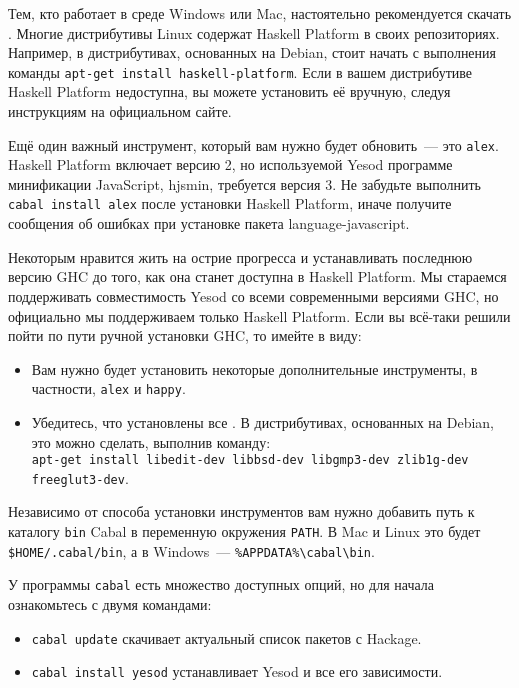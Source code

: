 Тем, кто работает в среде Windows или Mac, настоятельно рекомендуется скачать . Многие дистрибутивы Linux содержат Haskell Platform в своих репозиториях. Например, в дистрибутивах, основанных на Debian, стоит начать с выполнения команды \texttt{apt-get install haskell-platform}. Если в вашем дистрибутиве Haskell Platform недоступна, вы можете установить её вручную, следуя инструкциям на официальном сайте.

Ещё один важный инструмент, который вам нужно будет обновить~--- это \texttt{alex}. Haskell Platform включает версию 2, но используемой Yesod программе минификации JavaScript, hjsmin, требуется версия 3. Не забудьте выполнить \texttt{cabal install alex} после установки Haskell Platform, иначе получите сообщения об ошибках при установке пакета language-javascript.

\begin{remark}
Некоторым нравится жить на острие прогресса и устанавливать последнюю версию GHC до того, как она станет доступна в Haskell Platform. Мы стараемся поддерживать совместимость Yesod со всеми современными версиями GHC, но официально мы поддерживаем только Haskell Platform. Если вы всё-таки решили пойти по пути ручной установки GHC, то имейте в виду:

\begin{itemize}
  \item Вам нужно будет установить некоторые дополнительные инструменты, в частности, \texttt{alex} и \texttt{happy}.
  \item Убедитесь, что установлены все . В дистрибутивах, основанных на Debian, это можно сделать, выполнив команду:\\
 \texttt{apt-get install libedit-dev libbsd-dev libgmp3-dev zlib1g-dev freeglut3-dev}.
\end{itemize}
\end{remark}

Независимо от способа установки инструментов вам нужно добавить путь к каталогу \texttt{bin} Cabal в переменную окружения \texttt{PATH}. В Mac и Linux это будет \texttt{\$HOME/.cabal/bin}, а в Windows~--- \texttt{\%APPDATA\%\textbackslash{}cabal\textbackslash{}bin}.

У программы \texttt{cabal} есть множество доступных опций, но для начала ознакомьтесь с двумя командами:

\begin{itemize}
  \item \texttt{cabal update} скачивает актуальный список пакетов с Hackage.
  \item \texttt{cabal install yesod} устанавливает Yesod и все его зависимости.
\end{itemize}

